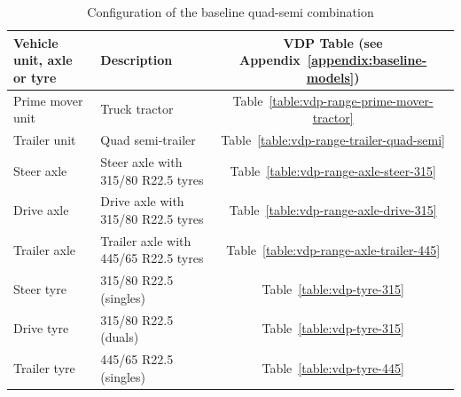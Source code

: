 \begin{table}[H]
	\centering\footnotesize
	\begin{threeparttable}

		\begin{tabulary}{\textwidth}{llc}
			\toprule
\textbf{Vehicle unit, axle or tyre} & \textbf{Description} & \textbf{VDP Table (see Appendix~\ref{appendix:baseline-models})} \\
		\midrule
    Prime mover unit & Truck tractor & Table~\ref{table:vdp-range-prime-mover-tractor} \\
    Trailer unit & Quad semi-trailer & Table~\ref{table:vdp-range-trailer-quad-semi} \\
    Steer axle  & Steer axle with 315/80 R22.5 tyres & Table~\ref{table:vdp-range-axle-steer-315} \\
    Drive axle & Drive axle with 315/80 R22.5 tyres & Table~\ref{table:vdp-range-axle-drive-315} \\
    Trailer axle & Trailer axle with 445/65 R22.5 tyres & Table~\ref{table:vdp-range-axle-trailer-445} \\
    Steer tyre & 315/80 R22.5 (singles) & Table~\ref{table:vdp-tyre-315} \\
    Drive tyre  & 315/80 R22.5 (duals) & Table~\ref{table:vdp-tyre-315} \\
    Trailer tyre & 445/65 R22.5 (singles) & Table~\ref{table:vdp-tyre-445} \\
			\bottomrule
		\end{tabulary}

		\caption{Configuration of the baseline quad-semi combination}
		\label{table:configuration-quad-semi}


	\end{threeparttable}
\end{table}

\newpage


